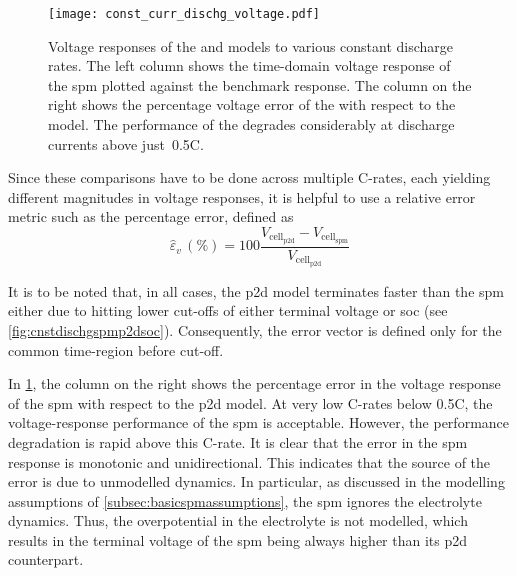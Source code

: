 \begin{figure}[!htb]
    \centering
    \texttt{[image: const\_curr\_dischg\_voltage.pdf]}
    \caption[Voltage responses of  and  to
    constant current discharge]{Voltage responses of the  and
         models to various constant discharge rates. The left
        column shows the time-domain voltage response of the \gls{spm}
        plotted against the benchmark  response. The column on the
        right shows the percentage voltage error of the  with
        respect to the  model. The performance of the
         degrades considerably at discharge currents above just~0.5C.}
    \label{fig:cnstdischgspmp2dvoltage}
\end{figure}

Since these comparisons  have to be done across multiple  C-rates, each yielding
different magnitudes in voltage responses, it is helpful to use a relative error
metric such as the percentage error, defined as
\begin{equation}
    \hat{\varepsilon}_v\,(\si{\percent}) = 100\frac{V_{\text{cell}_\text{p2d}} - V_{\text{cell}_\text{spm}}}{V_{\text{cell}_\text{p2d}}}
\end{equation}

It is to be noted that, in all cases, the \gls{p2d} model terminates faster than
the \gls{spm} either due to hitting lower cut-offs of either terminal voltage or
\gls{soc} (see \cref{fig:cnstdischgspmp2dsoc}).  Consequently, the  error vector
is defined only for the common time-region before cut-off.

In  \cref{fig:cnstdischgspmp2dvoltage},  the  column  on  the  right  shows  the
percentage error  in the voltage response  of the \gls{spm} with  respect to the
\gls{p2d} model.  At very  low C-rates  below \approx0.5C,  the voltage-response
performance of the \gls{spm} is acceptable. However, the performance degradation
is rapid above this C-rate. It is clear that the error in the \gls{spm} response
is monotonic and unidirectional. This indicates  that the source of the error is
due  to  unmodelled dynamics.  In  particular,  as  discussed in  the  modelling
assumptions  of  \cref{subsec:basicspmassumptions},  the \gls{spm}  ignores  the
electrolyte  dynamics.  Thus,  the  overpotential  in  the  electrolyte  is  not
modelled, which  results in the terminal  voltage of the \gls{spm}  being always
higher than its \gls{p2d} counterpart.

